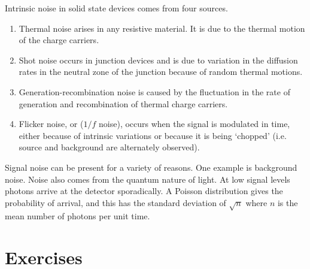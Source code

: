 Intrinsic noise in solid state devices comes from four sources.
\begin{enumerate}
\item Thermal noise arises in any resistive material. It is due to the thermal
motion of the charge carriers. 
\item Shot noise occurs in junction devices and is due to variation in 
the diffusion rates in the neutral zone of the junction because of random
thermal motions. 
\item Generation-recombination noise is caused by the fluctuation in the
rate of generation and recombination of thermal charge carriers. 
\item Flicker noise, or ($1/f$ noise), occurs when the signal is modulated
in time, either because of intrinsic variations or because it is being
`chopped' (i.e. source and background are alternately observed). 
\end{enumerate}

Signal noise can be present for a variety of reasons. One example is
background noise. Noise also comes from the quantum nature of light. At
low signal levels photons arrive at the detector sporadically. A Poisson
distribution gives the probability of arrival, and this has the standard
deviation of $\sqrt{n}$ where $n$ is the mean number of photons per unit
time. 


\section{Exercises}

